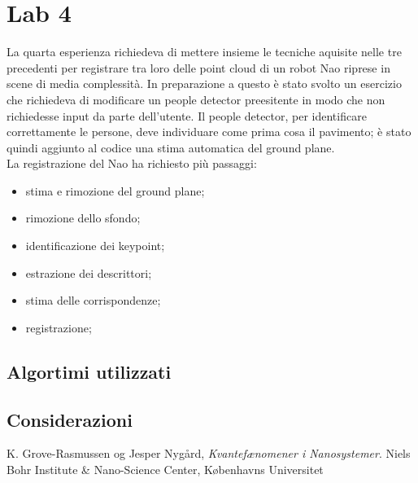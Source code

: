 \documentclass[a4paper]{article}
\begin{document}
\section{Lab 4} \label{sec:lab4}
La quarta esperienza richiedeva di mettere insieme le tecniche aquisite nelle tre precedenti per registrare tra loro delle point cloud di un robot Nao riprese in scene di media complessità. In preparazione a questo è stato svolto un esercizio che richiedeva di modificare un people detector preesitente in modo che non richiedesse input da parte dell'utente. Il people detector, per identificare correttamente le persone, deve individuare come prima cosa il pavimento; è stato quindi aggiunto al codice una stima automatica del ground plane.\\
La registrazione del Nao ha richiesto più passaggi:
\begin{itemize}
	\item stima e rimozione del ground plane;
	\item rimozione dello sfondo;
	\item identificazione dei keypoint;
	\item estrazione dei descrittori;
	\item stima delle corrispondenze;
	\item registrazione;
\end{itemize}


	\subsection{Algortimi utilizzati}


	\subsection{Considerazioni}


\begin{thebibliography}{9}
  K. Grove-Rasmussen og Jesper Nygård,
  \emph{Kvantefænomener i Nanosystemer}.
  Niels Bohr Institute \& Nano-Science Center, Københavns Universitet

\end{thebibliography}
\end{document}
